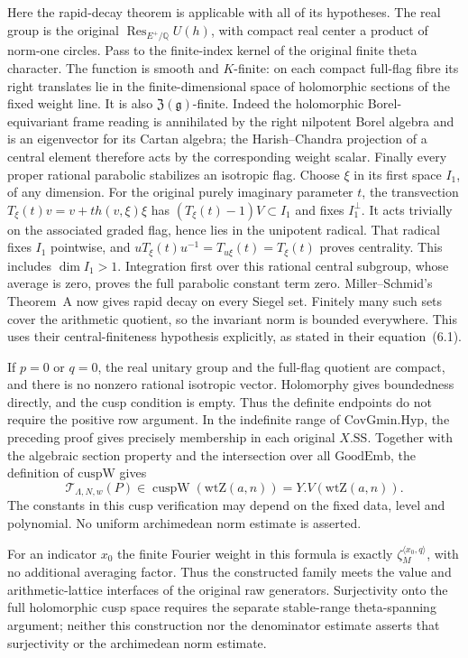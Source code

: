 Here the rapid-decay theorem is applicable with all of its hypotheses.
The real group is the original
$\operatorname{Res}_{E^+/\mathbb Q}U(h)$, with compact real center
a product of norm-one circles.  Pass to the finite-index kernel of the
original finite theta character.  The function is smooth and
$K$-finite: on each compact full-flag fibre its right translates lie
in the finite-dimensional space of holomorphic sections of the fixed
weight line.  It is also $\mathfrak Z(\mathfrak g)$-finite.
Indeed the holomorphic Borel-equivariant frame reading is annihilated
by the right nilpotent Borel algebra and is an eigenvector for its
Cartan algebra; the Harish--Chandra projection of a central element
therefore acts by the corresponding weight scalar.
Finally every proper rational parabolic stabilizes an isotropic flag.
Choose $\xi$ in its first space $I_1$, of any dimension.
For the original purely imaginary parameter $t$, the transvection
$T_\xi(t)v=v+t h(v,\xi)\xi$ has
$(T_\xi(t)-1)V\subset I_1$ and fixes $I_1^\perp$.
It acts trivially on the associated graded flag, hence lies in the
unipotent radical.  That radical fixes $I_1$ pointwise, and
$uT_\xi(t)u^{-1}=T_{u\xi}(t)=T_\xi(t)$ proves centrality.
This includes $\dim I_1>1$.
Integration first over this rational central subgroup, whose average
is zero, proves the full parabolic constant term zero.
Miller--Schmid's Theorem~A now gives rapid decay
on every Siegel set.  Finitely many such sets cover the arithmetic
quotient, so the invariant norm is bounded everywhere.
This uses their central-finiteness hypothesis explicitly, as stated in
their equation~(6.1).\cite{raw-theta-rapid-decay}

If $p=0$ or $q=0$, the real unitary group and the full-flag quotient
are compact, and there is no nonzero rational isotropic vector.
Holomorphy gives boundedness directly, and the cusp condition is empty.
Thus the definite endpoints do not require the positive row argument.
In the indefinite range of $\mathrm{CovGmin.Hyp}$, the preceding
proof gives precisely membership in each original $X.\mathrm{SS}$.
Together with the algebraic section property and the intersection over
all $\mathrm{GoodEmb}$, the definition of $\mathrm{cuspW}$ gives
\[
       \mathcal T_{\Lambda,N,w}(P)
          \in\operatorname{cuspW}(\mathrm{wtZ}(a,n))
          =Y.V(\mathrm{wtZ}(a,n)).
\]
The constants in this cusp verification may depend on the fixed data,
level and polynomial.  No uniform archimedean norm estimate is asserted.

For an indicator $x_0$ the finite Fourier weight in this formula
is exactly $\zeta_M^{\langle x_0,q\rangle}$, with no additional
averaging factor.  Thus the constructed family meets the value
and arithmetic-lattice interfaces of the original raw generators.
Surjectivity onto the full holomorphic cusp space requires the
separate stable-range theta-spanning argument; neither this
construction nor the denominator estimate asserts that
surjectivity or the archimedean norm estimate.

